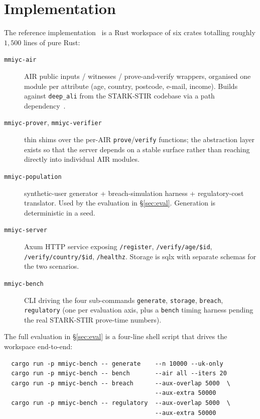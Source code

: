 \documentclass[11pt,a4paper]{article}
\begin{document}
\section{Implementation}
\label{sec:impl}

The reference implementation~\cite{mmiyc-impl} is a Rust workspace
of six crates totalling roughly $1{,}500$ lines of pure Rust:

\begin{description}
  \item[\texttt{mmiyc-air}] AIR public inputs / witnesses /
        prove\nobreakdash-and\nobreakdash-verify wrappers, organised
        one module per attribute (age, country, postcode, e\nobreakdash-mail,
        income).  Builds against
        \texttt{deep\_ali} from the
        STARK\nobreakdash-STIR codebase via a path
        dependency~\cite{stark-stir}.
  \item[\texttt{mmiyc-prover}, \texttt{mmiyc-verifier}] thin shims
        over the per\nobreakdash-AIR \texttt{prove}/\texttt{verify}
        functions; the abstraction layer exists so that the server
        depends on a stable surface rather than reaching directly
        into individual AIR modules.
  \item[\texttt{mmiyc-population}] synthetic\nobreakdash-user
        generator + breach\nobreakdash-simulation harness +
        regulatory\nobreakdash-cost translator.  Used by the
        evaluation in \S\ref{sec:eval}.  Generation is deterministic
        in a seed.
  \item[\texttt{mmiyc-server}] Axum HTTP service exposing
        \texttt{/register}, \texttt{/verify/age/\$id},
        \texttt{/verify/country/\$id}, \texttt{/healthz}.  Storage is
        sqlx with separate schemas for the two scenarios.
  \item[\texttt{mmiyc-bench}] CLI driving the four sub\nobreakdash-commands
        \texttt{generate}, \texttt{storage},
        \texttt{breach}, \texttt{regulatory} (one per evaluation axis,
        plus a \texttt{bench} timing harness pending the real
        STARK\nobreakdash-STIR prove\nobreakdash-time numbers).
\end{description}

The full evaluation in \S\ref{sec:eval} is a four\nobreakdash-line shell
script that drives the workspace end\nobreakdash-to\nobreakdash-end:

{\small
\begin{verbatim}
  cargo run -p mmiyc-bench -- generate    --n 10000 --uk-only
  cargo run -p mmiyc-bench -- bench       --air all --iters 20
  cargo run -p mmiyc-bench -- breach      --aux-overlap 5000  \
                                          --aux-extra 50000
  cargo run -p mmiyc-bench -- regulatory  --aux-overlap 5000  \
                                          --aux-extra 50000
\end{verbatim}
}
\end{document}
